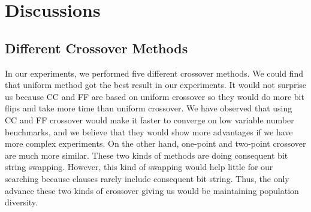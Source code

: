 \section{Discussions}

\subsection{Different Crossover Methods}
In our experiments, we performed five different crossover methods. We could find that uniform method got the best result in our experiments. It would not surprise us because CC and FF are based on uniform crossover so they would do more bit flips and take more time than uniform crossover. We have observed that using CC and FF crossover would make it faster to converge on low variable number benchmarks, and we believe that they would show more advantages if we have more complex experiments. On the other hand, one-point and two-point crossover are much more similar. These two kinds of methods are doing consequent bit string swapping. However, this kind of swapping would help little for our searching because clauses rarely include consequent bit string. Thus, the only advance these two kinds of crossover giving us would be maintaining population diversity.